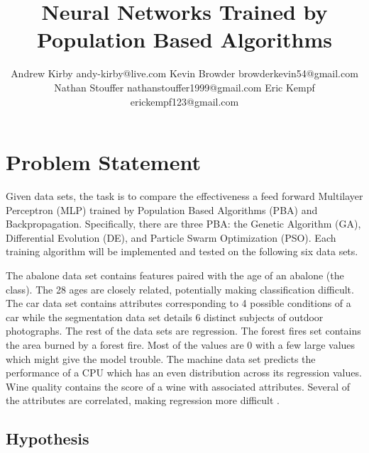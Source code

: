 \documentclass[twoside,11pt]{article}
\begin{document}
\title{Neural Networks Trained by Population Based Algorithms}

\author{\name Andrew Kirby \email andy-kirby@live.com \AND
		\name Kevin Browder \email browderkevin54@gmail.com \AND
		\name Nathan Stouffer \email nathanstouffer1999@gmail.com \AND
		\name Eric Kempf \email erickempf123@gmail.com }

\maketitle

\begin{abstract}

\end{abstract}

\section{Problem Statement}

	Given data sets, the task is to compare the effectiveness a feed forward Multilayer Perceptron (MLP) trained by Population Based Algorithms (PBA) and Backpropagation. Specifically, there are three PBA: the Genetic Algorithm (GA), Differential Evolution (DE), and Particle Swarm Optimization (PSO). 
	Each training algorithm will be implemented and tested on the following six data sets.
		
	The abalone data set contains features paired with the age of an abalone (the class). The 28 ages are closely related, potentially making classification difficult.
	The car data set contains attributes corresponding to 4 possible conditions of a car while the segmentation data set details 6 distinct subjects of outdoor photographs.
	The rest of the data sets are regression.
	The forest fires set contains the area burned by a forest fire. Most of the values are 0 with a few large values which might give the model trouble.
	The machine data set predicts the performance of a CPU which has an even distribution across its regression values. 
	Wine quality contains the score of a wine with associated attributes. Several of the attributes are correlated, making regression more difficult \citep{datasets}.

\subsection{Hypothesis}
\end{document}
